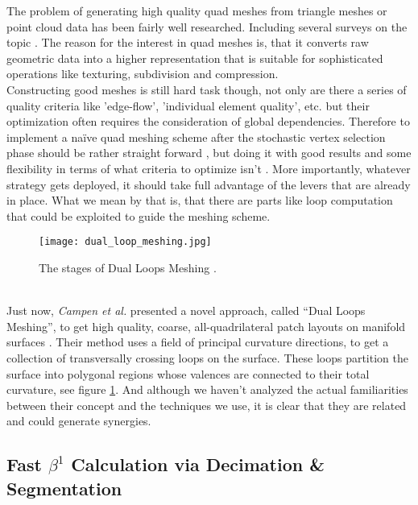 The problem of generating high quality quad meshes from triangle meshes or point cloud data has been fairly well researched.
Including several surveys on the topic \citep[cf. ][]{Alliez2005, Hormann2007}.
The reason for the interest in quad meshes is, that it converts raw geometric data into a higher representation that is suitable for sophisticated operations like texturing, subdivision and compression.\\
Constructing good meshes is still hard task though, not only are there a series of quality criteria like 'edge-flow', 'individual element quality', etc. but their optimization often requires the consideration of global dependencies.
Therefore to implement a naïve quad meshing scheme after the stochastic vertex selection phase should be rather straight forward \citep[cf.][]{Li2009}, but doing it with good results and some flexibility in terms of what criteria to optimize isn't \citep[][]{Bommes2009}.
More importantly, whatever strategy gets deployed, it should take full advantage of the levers that are already in place.
What we mean by that is, that there are parts like loop computation that could be exploited to guide the meshing scheme.
\begin{figure}[ht]
\centering
\texttt{[image: dual\_loop\_meshing.jpg]}
\caption{The stages of Dual Loops Meshing \citep[cf.][]{Campen2012}.}
\label{fig:dual_loop_meshing}
\end{figure}\\
Just now, \textit{Campen et al.} presented a novel approach, called ``Dual Loops Meshing'', to get high quality, coarse, all-quadrilateral patch layouts on manifold surfaces \citep[][]{Campen2012}.
Their method uses a field of principal curvature directions, to get a collection of transversally crossing loops on the surface.
These loops partition the surface into polygonal regions whose valences are connected to their total curvature, see figure \ref{fig:dual_loop_meshing}.
And although we haven't analyzed the actual familiarities between their concept and the techniques we use, it is clear that they are related and could generate synergies.


\subsection{Fast $\beta^{1}$ Calculation via Decimation \& Segmentation}
\label{conclusion22}

